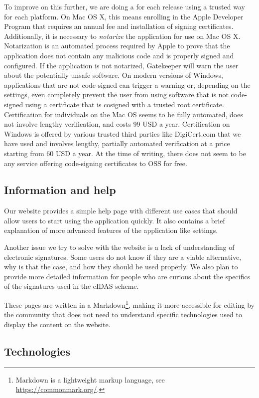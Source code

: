 \documentclass[thesismargins, english, thesislinespacing, onelinechapterstyle, upjsfrontpage]{rnthesis}
\begin{document}
To improve on this further, we are doing a  for each release using a trusted way for each platform.
On Mac OS X, this means enrolling in the Apple Developer Program that requires an annual fee and installation of signing certificates.
Additionally, it is necessary to \textit{notarize} the application for use on Mac OS X.
Notarization is an automated process required by Apple to prove that the application does not contain any malicious code and is properly signed and configured.
If the application is not notarized, Gatekeeper will warn the user about the potentially unsafe software.
On modern versions of Windows, applications that are not code-signed can trigger a warning or, depending on the settings, even completely prevent the user from using software that is not code-signed using a certificate that is cosigned with a trusted root certificate.
Certification for individuals on the Mac OS seems to be fully automated, does not involve lengthy verification, and costs 99 USD a year.
Certification on Windows is offered by various trusted third parties like DigiCert.com that we have used and involves lengthy, partially automated verification at a price starting from 60 USD a year.
At the time of writing, there does not seem to be any service offering code-signing certificates to OSS for free.

\subsection{Information and help}

Our website provides a simple help page with different use cases that should allow users to start using the application quickly.
It also contains a brief explanation of more advanced features of the application like settings.

Another issue we try to solve with the website is a lack of understanding of electronic signatures.
Some users do not know if they are a viable alternative, why is that the case, and how they should be used properly.
We also plan to provide more detailed information for people who are curious about the specifics of the signatures used in the eIDAS scheme.

These pages are written in a Markdown\footnote{Markdown is a lightweight markup language, see \url{https://commonmark.org/}.}, making it more accessible for editing by the community that does not need to understand specific technologies used to display the content on the website.

\subsection{Technologies}
\end{document}
